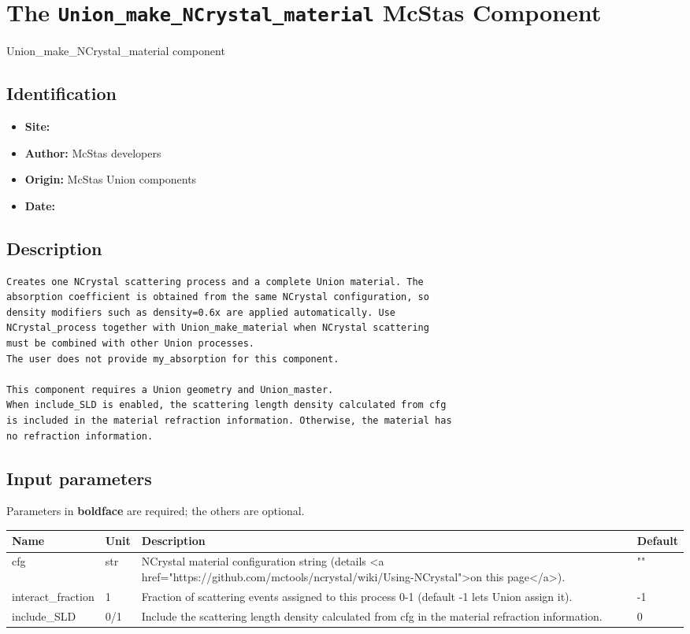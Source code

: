 \section{The \texttt{Union\_make\_NCrystal\_material} McStas Component}
Union\_make\_NCrystal\_material component

\subsection*{Identification}
\begin{itemize}
  \item \textbf{Site:}
  \item \textbf{Author:} McStas developers
  \item \textbf{Origin:} McStas Union components
  \item \textbf{Date:}
\end{itemize}

\subsection*{Description}
\begin{lstlisting}
Creates one NCrystal scattering process and a complete Union material. The
absorption coefficient is obtained from the same NCrystal configuration, so
density modifiers such as density=0.6x are applied automatically. Use
NCrystal_process together with Union_make_material when NCrystal scattering
must be combined with other Union processes.
The user does not provide my_absorption for this component.

This component requires a Union geometry and Union_master.
When include_SLD is enabled, the scattering length density calculated from cfg
is included in the material refraction information. Otherwise, the material has
no refraction information.
\end{lstlisting}

\subsection*{Input parameters}
Parameters in \textbf{boldface} are required; the others are optional.

\begin{longtable}{p{}p{}p{}p{}}
\toprule
\textbf{Name} & \textbf{Unit} & \textbf{Description} & \textbf{Default} \\
\midrule
\endhead
cfg & str & NCrystal material configuration string (details \textless{}a href="https://github.com/mctools/ncrystal/wiki/Using-NCrystal"\textgreater{}on this page\textless{}/a\textgreater{}). & "" \\
interact\_fraction & 1 & Fraction of scattering events assigned to this process 0-1 (default -1 lets Union assign it). & -1 \\
include\_SLD & 0/1 & Include the scattering length density calculated from cfg in the material refraction information. & 0 \\
\bottomrule
\end{longtable}

